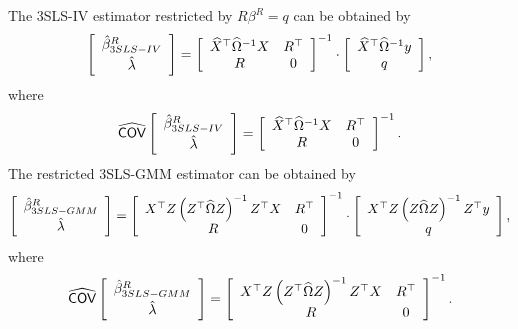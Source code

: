 The 3SLS-IV estimator restricted by $R \beta^R = q$ can be obtained by
\begin{equation}
   \left[ \begin{array}{c}
      \hat{\beta}^R_{3SLS-IV} \\[0.2em] \hat{\lambda}
   \end{array} \right]
   =
   \left[ \begin{array}{cc}
      \widehat{X}^\top \widehat{\Omega}^{-1} X & R^\top \\
      R & 0
   \end{array} \right]^{-1}
   \cdot
   \left[ \begin{array}{c}
      \widehat{X}^\top \widehat{\Omega}^{-1} y \\ q
   \end{array} \right] ,
   \label{eq:3slsIvR}
\end{equation}
where
\begin{equation}
   \widehat{\mathsf{COV}}
   \left[ \begin{array}{c}
      \hat{\beta}^R_{3SLS-IV} \\[0.2em] \hat{\lambda}
   \end{array} \right] 
   = 
   \left[ \begin{array}{cc}
      \widehat{X}^\top \widehat{\Omega}^{-1} X & R^\top \\
      R & 0
   \end{array} \right]^{-1} .
\end{equation}
The restricted 3SLS-GMM estimator can be obtained by
\begin{equation}
   \left[ \begin{array}{c}
      \hat{\beta}^R_{3SLS-GMM} \\[0.2em] \hat{\lambda}
   \end{array} \right]
   =
   \left[ \begin{array}{cc}
      X^\top Z \left( Z^\top \widehat{\Omega} Z \right)^{-1} Z^\top X & R^\top \\
      R & 0
   \end{array} \right]^{-1}
   \cdot
   \left[ \begin{array}{c}
      X^\top Z \left( Z \widehat{\Omega} Z \right)^{-1} Z^\top y \\ q
   \end{array} \right] ,
   \label{eq:3slsGmmR}
\end{equation}
where
\begin{equation}
   \widehat{\mathsf{COV}}
   \left[ \begin{array}{c}
      \hat{\beta}^R_{3SLS-GMM} \\[0.2em] \hat{\lambda}
   \end{array} \right] 
   = 
   \left[ \begin{array}{cc}
      X^\top Z \left( Z^\top \widehat{\Omega} Z \right)^{-1} Z^\top X & R^\top \\
      R & 0
   \end{array} \right]^{-1} .
\end{equation}
